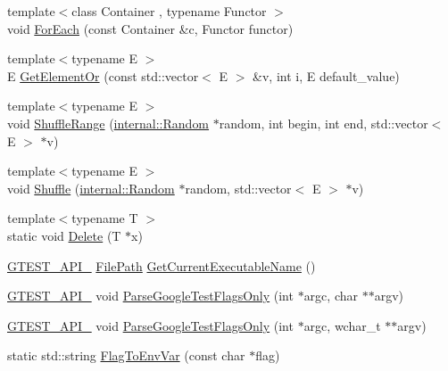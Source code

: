 \begin{DoxyCompactItemize}
\item 
{\footnotesize template$<$class Container , typename Functor $>$ }\\void \hyperlink{namespacetesting_1_1internal_a52f5504ed65d116201ccb8f99a44fd7e}{For\+Each} (const Container \&c, Functor functor)
\item 
{\footnotesize template$<$typename E $>$ }\\E \hyperlink{namespacetesting_1_1internal_a71fdd20a0686bea3dc0cdcd95e0bca1c}{Get\+Element\+Or} (const std\+::vector$<$ E $>$ \&v, int i, E default\+\_\+value)
\item 
{\footnotesize template$<$typename E $>$ }\\void \hyperlink{namespacetesting_1_1internal_a0e1d3dc36138a591769412d4c7779861}{Shuffle\+Range} (\hyperlink{classtesting_1_1internal_1_1Random}{internal\+::\+Random} $\ast$random, int begin, int end, std\+::vector$<$ E $>$ $\ast$v)
\item 
{\footnotesize template$<$typename E $>$ }\\void \hyperlink{namespacetesting_1_1internal_a90d9e6ffe8522a7eb1b2ce9b1a0c4673}{Shuffle} (\hyperlink{classtesting_1_1internal_1_1Random}{internal\+::\+Random} $\ast$random, std\+::vector$<$ E $>$ $\ast$v)
\item 
{\footnotesize template$<$typename T $>$ }\\static void \hyperlink{namespacetesting_1_1internal_a1e7045e09392aece10aea4517458b7ed}{Delete} (T $\ast$x)
\item 
\hyperlink{gtest-port_8h_aa73be6f0ba4a7456180a94904ce17790}{G\+T\+E\+S\+T\+\_\+\+A\+P\+I\+\_\+} \hyperlink{classtesting_1_1internal_1_1FilePath}{File\+Path} \hyperlink{namespacetesting_1_1internal_a7a2bbf069f75bc99873976ad6fc356ad}{Get\+Current\+Executable\+Name} ()
\item 
\hyperlink{gtest-port_8h_aa73be6f0ba4a7456180a94904ce17790}{G\+T\+E\+S\+T\+\_\+\+A\+P\+I\+\_\+} void \hyperlink{namespacetesting_1_1internal_a472880afbcc592a41e3d623e2dec8412}{Parse\+Google\+Test\+Flags\+Only} (int $\ast$argc, char $\ast$$\ast$argv)
\item 
\hyperlink{gtest-port_8h_aa73be6f0ba4a7456180a94904ce17790}{G\+T\+E\+S\+T\+\_\+\+A\+P\+I\+\_\+} void \hyperlink{namespacetesting_1_1internal_aa3c81a67914856448d0778990d9d9cab}{Parse\+Google\+Test\+Flags\+Only} (int $\ast$argc, wchar\+\_\+t $\ast$$\ast$argv)
\item 
static std\+::string \hyperlink{namespacetesting_1_1internal_a7540386ecf74d7ab7e2fa6089db94682}{Flag\+To\+Env\+Var} (const char $\ast$flag)

\end{DoxyCompactItemize}
